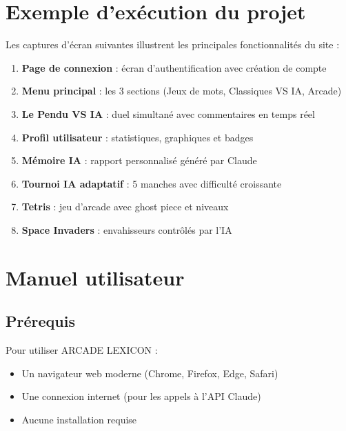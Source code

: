 \documentclass[a4paper, 12pt, twoside]{article}
\begin{document}
\section{Exemple d'exécution du projet}


\noindent Les captures d'écran suivantes illustrent les principales fonctionnalités du site :

\begin{enumerate}
  \item \textbf{Page de connexion} : écran d'authentification avec création de compte
  \item \textbf{Menu principal} : les 3 sections (Jeux de mots, Classiques VS IA, Arcade)
  \item \textbf{Le Pendu VS IA} : duel simultané avec commentaires en temps réel
  \item \textbf{Profil utilisateur} : statistiques, graphiques et badges
  \item \textbf{Mémoire IA} : rapport personnalisé généré par Claude
  \item \textbf{Tournoi IA adaptatif} : 5 manches avec difficulté croissante
  \item \textbf{Tetris} : jeu d'arcade avec ghost piece et niveaux
  \item \textbf{Space Invaders} : envahisseurs contrôlés par l'IA
\end{enumerate}


\section{Manuel utilisateur}

\subsection{Prérequis}

Pour utiliser ARCADE LEXICON :
\begin{itemize}
  \item Un navigateur web moderne (Chrome, Firefox, Edge, Safari)
  \item Une connexion internet (pour les appels à l'API Claude)
  \item Aucune installation requise
\end{itemize}
\end{document}
